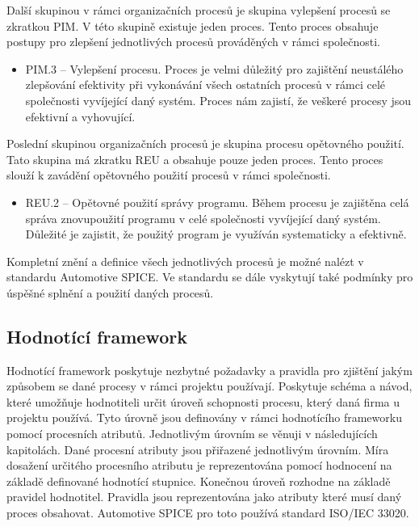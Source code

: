 \documentclass[czech,master,public,dept460,male,cpdeclaration,oneside]{diploma}
\begin{document}
Další skupinou v rámci organizačních procesů je skupina vylepšení procesů se zkratkou PIM. V této skupině existuje jeden proces. Tento proces obsahuje postupy pro zlepšení jednotlivých procesů prováděných v rámci společnosti.

\begin{itemize}
	\item PIM.3 -- Vylepšení procesu. Proces je velmi důležitý pro zajištění neustálého zlepšování efektivity při vykonávání všech ostatních procesů v rámci celé společnosti vyvíjející daný systém. Proces nám zajistí, že veškeré procesy jsou efektivní a vyhovující.
\end{itemize}

Poslední skupinou organizačních procesů je skupina procesu opětovného použití. Tato skupina má zkratku REU a obsahuje pouze jeden proces. Tento proces slouží k zavádění opětovného použití procesů v rámci společnosti.

\begin{itemize}
	\item REU.2 -- Opětovné použití správy programu. Během procesu je zajištěna celá správa znovupoužití programu v celé společnosti vyvíjející daný systém. Důležité je zajistit, že použitý program je využíván systematicky a efektivně.
\end{itemize}


Kompletní znění a definice všech jednotlivých procesů je možné nalézt v standardu Automotive SPICE. \cite{ref:aspice_procesy} Ve standardu se dále vyskytují také podmínky pro úspěšné splnění a použití daných procesů.


\subsection{Hodnotící framework}
Hodnotící framework poskytuje nezbytné požadavky a pravidla pro zjištění jakým způsobem se dané procesy v rámci projektu používají. Poskytuje schéma a návod, které umožňuje hodnotiteli určit úroveň schopnosti procesu, který daná firma u projektu používá. Tyto úrovně jsou definovány v rámci hodnotícího frameworku pomocí procesních atributů. Jednotlivým úrovním se věnuji v následujících kapitolách. Dané procesní atributy jsou přiřazené jednotlivým úrovním. Míra dosažení určitého procesního atributu je reprezentována pomocí hodnocení na základě definované hodnotící stupnice. Konečnou úroveň rozhodne na základě pravidel hodnotitel. Pravidla jsou reprezentována jako atributy které musí daný proces obsahovat. Automotive SPICE pro toto používá standard ISO/IEC 33020. \cite{ref:aspice_download_1523}
\end{document}
